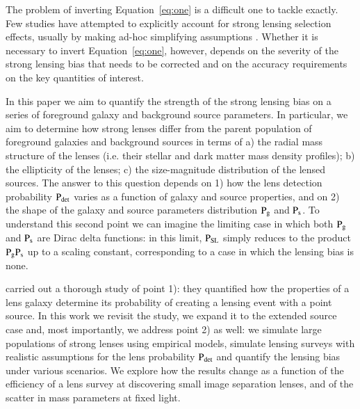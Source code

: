 \documentclass{aa}
\def\prlens{{\rm P}_\mathrm{g}}
\def\prsource{{\rm P}_\mathrm{s}}
\def\prsl{{\rm P}_\mathrm{{SL}}}
\def\pdet{{\rm P}_\mathrm{det}}
\def\Eref#1{Equation~\ref{#1}\xspace}
\begin{document}
The problem of inverting \Eref{eq:one} is a difficult one to tackle exactly.
Few studies have attempted to explicitly account for strong lensing selection effects, usually by making ad-hoc simplifying assumptions \citep{Son++15,O+A17,Son++19}.
Whether it is necessary to invert \Eref{eq:one}, however, depends on the severity of the strong lensing bias that needs to be corrected and on the accuracy requirements on the key quantities of interest.

In this paper we aim to quantify the strength of the strong lensing bias on a series of foreground galaxy and background source parameters. %
In particular, we aim to determine how strong lenses differ from the parent population of foreground galaxies and background sources in terms of a) the radial mass structure of the lenses (i.e. their stellar and dark matter mass density profiles); b) the ellipticity of the lenses; c) the size-magnitude distribution of the lensed sources.
The answer to this question depends on 1) how the lens detection probability $\pdet$ varies as a function of galaxy and source properties, and on 2) the shape of the galaxy and source parameters distribution $\prlens$ and $\prsource$. To understand this second point we can imagine the limiting case in which both $\prlens$ and $\prsource$ are Dirac delta functions: in this limit, $\prsl$ simply reduces to the product $\prlens\prsource$ up to a scaling constant, corresponding to a case in which the lensing bias is none.

\citet{MVK09} carried out a thorough study of point 1): they quantified how the properties of a lens galaxy determine its probability of creating a lensing event with a point source.
In this work we revisit the \citet{MVK09} study, we expand it to the extended source case and, most importantly, we address point 2) as well: we simulate large populations of strong lenses using empirical models, simulate lensing surveys with realistic assumptions for the lens probability $\pdet$ and quantify the lensing bias under various scenarios.
We explore how the results change as a function of the efficiency of a lens survey at discovering small image separation lenses, and of the scatter in mass parameters at fixed light.
\end{document}
